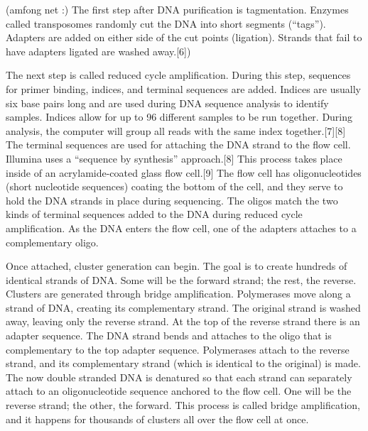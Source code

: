(amfong net :) The first step after DNA purification is tagmentation. Enzymes called transposomes randomly cut the DNA into short segments (“tags”). Adapters are added on either side of the cut points (ligation). Strands that fail to have adapters ligated are washed away.[6])

The next step is called reduced cycle amplification. During this step, sequences for primer binding, indices, and terminal sequences are added. Indices are usually six base pairs long and are used during DNA sequence analysis to identify samples. Indices allow for up to 96 different samples to be run together. During analysis, the computer will group all reads with the same index together.[7][8] The terminal sequences are used for attaching the DNA strand to the flow cell. Illumina uses a “sequence by synthesis” approach.[8] This process takes place inside of an acrylamide-coated glass flow cell.[9] The flow cell has oligonucleotides (short nucleotide sequences) coating the bottom of the cell, and they serve to hold the DNA strands in place during sequencing. The oligos match the two kinds of terminal sequences added to the DNA during reduced cycle amplification. As the DNA enters the flow cell, one of the adapters attaches to a complementary oligo.

Once attached, cluster generation can begin. The goal is to create hundreds of identical strands of DNA. Some will be the forward strand; the rest, the reverse. Clusters are generated through bridge amplification. Polymerases move along a strand of DNA, creating its complementary strand. The original strand is washed away, leaving only the reverse strand. At the top of the reverse strand there is an adapter sequence. The DNA strand bends and attaches to the oligo that is complementary to the top adapter sequence. Polymerases attach to the reverse strand, and its complementary strand (which is identical to the original) is made. The now double stranded DNA is denatured so that each strand can separately attach to an oligonucleotide sequence anchored to the flow cell. One will be the reverse strand; the other, the forward. This process is called bridge amplification, and it happens for thousands of clusters all over the flow cell at once.

